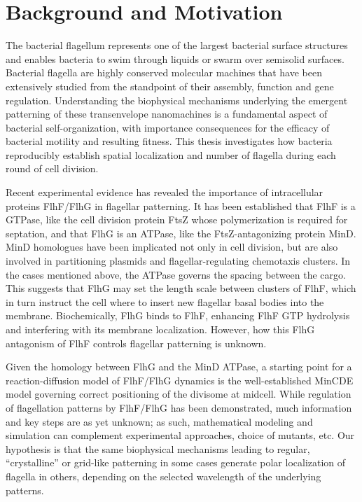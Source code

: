 \section{Background and Motivation}
The bacterial flagellum represents one of the largest bacterial surface structures and enables bacteria to swim through liquids or swarm over semisolid surfaces.~\cite{Guttenplan2013}  Bacterial flagella are highly conserved molecular machines that have been extensively studied from the standpoint of their assembly, function and gene regulation. Understanding the biophysical mechanisms underlying the emergent patterning of these transenvelope nanomachines is a fundamental aspect of bacterial self-organization, with importance consequences for the efficacy of bacterial motility and resulting fitness. This thesis investigates how bacteria reproducibly establish spatial localization and number of flagella during each round of cell division. 

Recent experimental evidence has revealed the importance of intracellular proteins FlhF/FlhG in flagellar patterning.  It has been established that FlhF is a GTPase, like the cell division protein FtsZ whose polymerization is required for septation, and that FlhG is an ATPase, like the FtsZ-antagonizing protein MinD.  MinD homologues have been implicated not only in cell division, but are also involved in partitioning plasmids and flagellar-regulating chemotaxis clusters. In the cases mentioned above, the ATPase governs the spacing between the cargo. This suggests that FlhG may set the length scale between clusters of FlhF, which in turn instruct the cell where to insert new flagellar basal bodies into the membrane. Biochemically, FlhG binds to FlhF, enhancing FlhF GTP hydrolysis and interfering with its membrane localization. However, how this FlhG antagonism of FlhF controls flagellar patterning is unknown.

Given the homology between FlhG and the MinD ATPase, a starting point for a reaction-diffusion model of  FlhF/FlhG dynamics is the well-established MinCDE model governing correct positioning of the divisome at midcell. While regulation of  flagellation patterns  by FlhF/FlhG has been demonstrated, much information and key steps are as yet unknown; as such, mathematical  modeling and simulation can complement experimental approaches, choice of mutants, etc.  Our hypothesis is that the same biophysical mechanisms leading to regular,  “crystalline” or grid-like patterning in some cases generate polar localization of flagella in others, depending on the selected wavelength of the underlying patterns.

